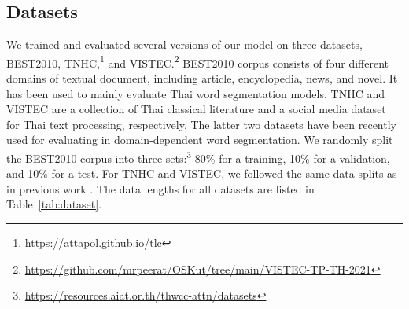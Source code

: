 \subsection{Datasets} 
%
We trained and evaluated several versions of our model on three datasets, BEST2010, TNHC,\footnote{\url{https://attapol.github.io/tlc}} and VISTEC.\footnote{\url{https://github.com/mrpeerat/OSKut/tree/main/VISTEC-TP-TH-2021}}
%
BEST2010 corpus consists of four different domains of textual document, including article, encyclopedia, news, and novel.
%
It has been used to mainly evaluate Thai word segmentation models.
%
TNHC and VISTEC are a collection of Thai classical literature and a social media dataset for Thai text processing, respectively.
%
The latter two datasets have been recently used for evaluating in domain-dependent word segmentation.
%
We randomly split the BEST2010 corpus into three sets:\footnote{\url{https://resources.aiat.or.th/thwcc-attn/datasets}} 80\% for a training, 10\% for a validation, and 10\% for a test.
%
For TNHC and VISTEC, we followed the same data splits as in previous work \cite{limkonchotiwat-etal-2020-domain,limkonchotiwat-etal-2021-handling}.
%
The data lengths for all datasets are listed in Table~\ref{tab:dataset}.
%
\begin{table}
\centering
{}
\caption{Data size, including the number of sentences (S), words (W), vocabulary (V), and characters (Ch).}
\label{tab:dataset}
\end{table}

